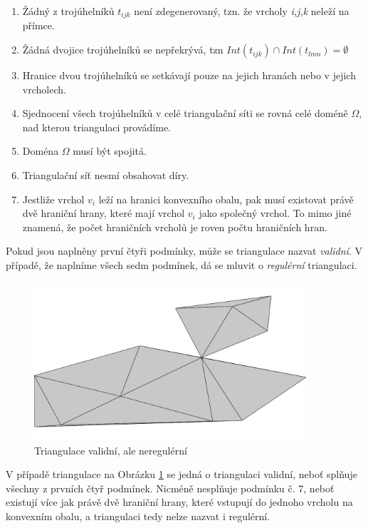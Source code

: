 \documentclass[12pt,a4paper]{article}
\begin{document}
\begin{enumerate}
\item Žádný z trojúhelníků $t_{ijk}$ není zdegenerovaný, tzn. že vrcholy \textit{i,j,k} neleží na přímce.
\item Žádná dvojice trojúhelníků se nepřekrývá, tzn $Int(t_{ijk}) \cap Int(t_{lmn}) = \emptyset$
\item Hranice dvou trojúhelníků se setkávají pouze na jejich hranách nebo v jejich vrcholech.
\item Sjednocení všech trojúhelníků v celé triangulační síti se rovná celé doméně $\Omega$, nad kterou triangulaci provádíme.
\item Doména $\Omega$ musí být spojitá.
\item Triangulační síť nesmí obsahovat díry.
\item Jestliže vrchol $v_i$ leží na hranici konvexního obalu, pak musí existovat právě dvě hraniční hrany, které mají vrchol $v_i$ jako společný vrchol. To mimo jiné znamená, že počet hraničních vrcholů je roven počtu hraničních hran.
\end{enumerate}

Pokud jsou naplněny první čtyři podmínky, může se triangulace nazvat \textit{validní}. V případě, že naplníme všech sedm podmínek, dá se mluvit o \textit{regulérní} triangulaci.

\newpage
\begin{figure}[h!]
\centering
\includegraphics[width=0.9\textwidth]{../img/vnr.png}
\caption{Triangulace validní, ale neregulérní}
\label{fig:trian_valid_not_reg}
\end{figure}

V případě triangulace na Obrázku \ref{fig:trian_valid_not_reg} se jedná o triangulaci validní, neboť splňuje všechny z prvních čtyř podmínek. Nicméně nesplňuje podmínku č. 7, neboť existují více jak právě dvě hraniční hrany, které vstupují do jednoho vrcholu na konvexním obalu, a triangulaci tedy nelze nazvat i regulérní.
\end{document}
